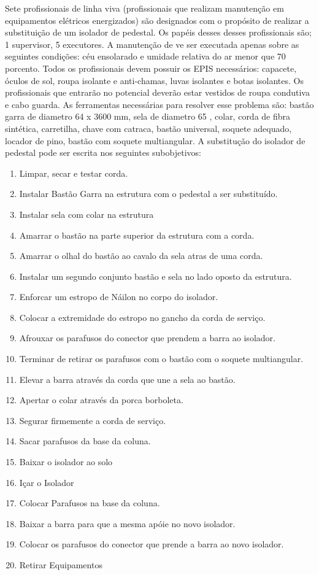 \documentclass[12pt]{article}
\begin{document}
Sete profissionais de linha viva (profissionais que realizam manutenção em equipamentos elétricos energizados) são designados com o propósito de realizar a substituição de um isolador de pedestal. Os papéis desses desses profissionais são; 1 supervisor, 5 executores. A manutenção de ve ser executada apenas sobre as seguintes condições: céu ensolarado e umidade relativa do ar menor que 70 porcento. Todos os profissionais devem possuir os EPIS necessários: capacete, óculos de sol, roupa isolante e anti-chamas, luvas isolantes e botas isolantes. Os profissionais que entrarão no potencial deverão estar vestidos de roupa condutiva e cabo guarda. As ferramentas necessárias para resolver esse problema são: bastão garra de diametro 64 x 3600 mm, sela de diametro 65 , colar, corda de fibra sintética, carretilha, chave com catraca, bastão universal, soquete adequado, locador de pino, bastão com soquete multiangular. A substitução do isolador de pedestal pode ser escrita nos seguintes subobjetivos: 


\begin{enumerate}
	\item Limpar, secar e testar corda.
	\item Instalar Bastão Garra na estrutura com o pedestal a ser substituído.
	\item Instalar sela com colar na estrutura
	\item Amarrar o bastão na parte superior da estrutura com a corda.
	\item Amarrar o olhal do bastão ao cavalo da sela atras de uma corda.
	\item Instalar um segundo conjunto bastão e sela no lado oposto da estrutura.
	\item Enforcar um estropo de Náilon no corpo do isolador.
	\item Colocar a extremidade do estropo no gancho da corda de serviço.
	\item Afrouxar os parafusos do conector que prendem a barra ao isolador.
	\item Terminar de retirar os parafusos com o bastão com o soquete multiangular.
	\item Elevar a barra através da corda que une a sela ao bastão.
	\item Apertar o colar através da porca borboleta.
	\item Segurar firmemente a corda de serviço.
	\item Sacar parafusos da base da coluna.
	\item Baixar o isolador ao solo
	\item Içar o Isolador
	\item Colocar Parafusos na base da coluna.
	\item Baixar a barra para que a mesma apóie no novo isolador.
	\item Colocar os parafusos do conector que prende a barra ao novo isolador. 
	\item Retirar Equipamentos
\end{enumerate}
\end{document}
